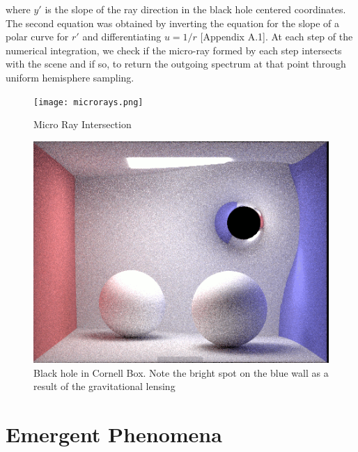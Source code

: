 \documentclass[sigconf]{acmart}
\begin{document}
where $y'$ is the slope of the ray direction in the black hole centered coordinates.  The second equation was obtained by inverting the equation for the slope of a polar curve for $r'$ and differentiating $u = 1/r$ [Appendix A.1]. At each step of the numerical integration, we check if the micro-ray formed by each step intersects with the scene and if so, to return the outgoing spectrum at that point through uniform hemisphere sampling.

\begin{figure}[h]
  \centering
  \texttt{[image: microrays.png]}
  \caption{Micro Ray Intersection}
  \Description{}
\end{figure}

\begin{figure}[h]
  \centering
  \includegraphics[width=\linewidth]{lense.png}
  \caption{Black hole in Cornell Box. Note the bright spot on the blue wall as a result of the gravitational lensing}
\end{figure}

\section{Emergent Phenomena}
\end{document}
